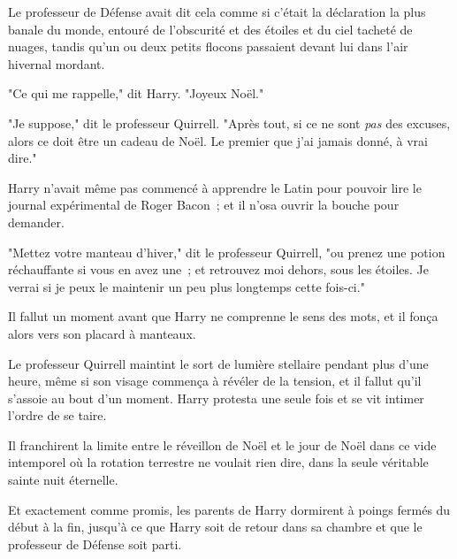 Le professeur de Défense avait dit cela comme si c'était la déclaration la plus banale du monde, entouré de l'obscurité et des étoiles et du ciel tacheté de nuages, tandis qu'un ou deux petits flocons passaient devant lui dans l'air hivernal mordant.

"Ce qui me rappelle," dit Harry. "Joyeux Noël."

"Je suppose," dit le professeur Quirrell. "Après tout, si ce ne sont \emph{pas} des excuses, alors ce doit être un cadeau de Noël. Le premier que j'ai jamais donné, à vrai dire."

Harry n'avait même pas commencé à apprendre le Latin pour pouvoir lire le journal expérimental de Roger Bacon~; et il n'osa ouvrir la bouche pour demander.

"Mettez votre manteau d'hiver," dit le professeur Quirrell, "ou prenez une potion réchauffante si vous en avez une~; et retrouvez moi dehors, sous les étoiles. Je verrai si je peux le maintenir un peu plus longtemps cette fois-ci."

Il fallut un moment avant que Harry ne comprenne le sens des mots, et il fonça alors vers son placard à manteaux.

Le professeur Quirrell maintint le sort de lumière stellaire pendant plus d'une heure, même si son visage commença à révéler de la tension, et il fallut qu'il s'assoie au bout d'un moment. Harry protesta une seule fois et se vit intimer l'ordre de se taire.

Il franchirent la limite entre le réveillon de Noël et le jour de Noël dans ce vide intemporel où la rotation terrestre ne voulait rien dire, dans la seule véritable sainte nuit éternelle.

Et exactement comme promis, les parents de Harry dormirent à poings fermés du début à la fin, jusqu'à ce que Harry soit de retour dans sa chambre et que le professeur de Défense soit parti.
